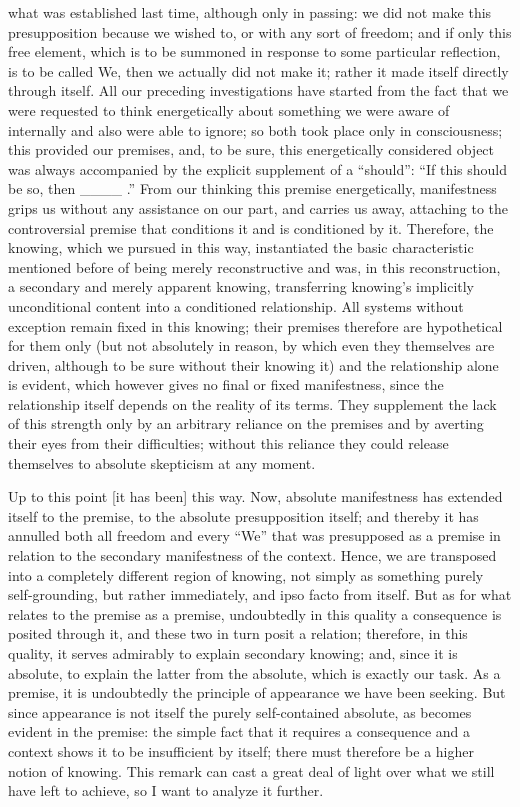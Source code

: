 what was established last time,
although only in passing:
we did not make this presupposition
because we wished to,
or with any sort of freedom;
and if only this free element,
which is to be summoned in response to
some particular reflection,
is to be called We,
then we actually did not make it;
rather it made itself directly through itself.
All our preceding investigations have started from
the fact that we were requested to think energetically
about something we were aware of internally and
also were able to ignore;
so both took place only in consciousness;
this provided our premises, and, to be sure,
this energetically considered object was always
accompanied by the explicit supplement of a “should”:
“If this should be so, then ____ .”
From our thinking this premise energetically,
manifestness grips us without any assistance on our part,
and carries us away, attaching to the controversial premise
that conditions it and is conditioned by it.
Therefore, the knowing, which we pursued in this way,
instantiated the basic characteristic mentioned before
of being merely reconstructive and was, in this reconstruction,
a secondary and merely apparent knowing,
transferring knowing's implicitly unconditional content
into a conditioned relationship.
All systems without exception remain fixed in this knowing;
their premises therefore are hypothetical for them only
(but not absolutely in reason,
by which even they themselves are driven,
although to be sure without their knowing it)
and the relationship alone is evident,
which however gives no final or fixed manifestness,
since the relationship itself depends on
the reality of its terms.
They supplement the lack of this strength
only by an arbitrary reliance on the premises
and by averting their eyes from their difficulties;
without this reliance they could release themselves
to absolute skepticism at any moment.

Up to this point [it has been] this way.
Now, absolute manifestness has extended itself to the premise,
to the absolute presupposition itself;
and thereby it has annulled both all freedom
and every “We” that was presupposed as a premise
in relation to the secondary manifestness of the context.
Hence, we are transposed into a
completely different region of knowing,
not simply as something purely self-grounding,
but rather immediately, and ipso facto from itself.
But as for what relates to the premise as a premise,
undoubtedly in this quality a consequence is posited through it,
and these two in turn posit a relation;
therefore, in this quality,
it serves admirably to
explain secondary knowing;
and, since it is absolute,
to explain the latter from the absolute,
which is exactly our task.
As a premise, it is undoubtedly
the principle of appearance we have been seeking.
But since appearance is not itself
the purely self-contained absolute,
as becomes evident in the premise:
the simple fact that it requires
a consequence and a context
shows it to be insufficient by itself;
there must therefore be a higher notion of knowing.
This remark can cast a great deal of light
over what we still have left to achieve,
so I want to analyze it further.

